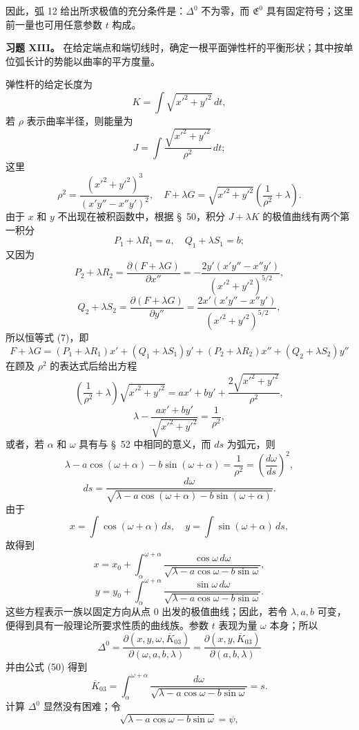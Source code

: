 \documentclass[11pt,a4paper,leqno]{article}
\begin{document}
因此，弧 12 给出所求极值的充分条件是：$\Delta^0$ 不为零，而 $\mathfrak{E}^0$ 具有固定符号；这里前一量也可用任意参数 $t$ 构成。

\noindent\textbf{习题 XIII。} 在给定端点和端切线时，确定一根平面弹性杆的平衡形状；其中按单位弧长计的势能以曲率的平方度量。

弹性杆的给定长度为
\[
K=\int\sqrt{x'^2+y'^2}\,dt,
\]
若 $\rho$ 表示曲率半径，则能量为
\[
J=\int\frac{\sqrt{x'^2+y'^2}}{\rho^2}\,dt;
\]
这里
\[
\rho^2=\frac{(x'^2+y'^2)^3}{(x'y''-x''y')^2},
\quad
F+\lambda G=\sqrt{x'^2+y'^2}\left(\frac1{\rho^2}+\lambda\right).
\]
由于 $x$ 和 $y$ 不出现在被积函数中，根据 \S~50，积分 $J+\lambda K$ 的极值曲线有两个第一积分
\[
P_1+\lambda R_1=a,\quad Q_1+\lambda S_1=b;
\]
又因为
\[
P_2+\lambda R_2
=\frac{\partial(F+\lambda G)}{\partial x''}
=-\frac{2y'(x'y''-x''y')}{(x'^2+y'^2)^{5/2}},
\]
\[
Q_2+\lambda S_2
=\frac{\partial(F+\lambda G)}{\partial y''}
=\frac{2x'(x'y''-x''y')}{(x'^2+y'^2)^{5/2}},
\]
所以恒等式 (7)，即
\[
F+\lambda G=(P_1+\lambda R_1)x'+(Q_1+\lambda S_1)y'
+(P_2+\lambda R_2)x''+(Q_2+\lambda S_2)y''
\]
在顾及 $\rho^2$ 的表达式后给出方程
\[
\left(\frac1{\rho^2}+\lambda\right)\sqrt{x'^2+y'^2}
=ax'+by'+\frac{2\sqrt{x'^2+y'^2}}{\rho^2},
\]
\[
\lambda-\frac{ax'+by'}{\sqrt{x'^2+y'^2}}=\frac1{\rho^2},
\]
或者，若 $\alpha$ 和 $\omega$ 具有与 \S~52 中相同的意义，而 $ds$ 为弧元，则
\begin{equation}\tag{49}
\lambda-a\cos(\omega+\alpha)-b\sin(\omega+\alpha)
=\frac1{\rho^2}=\left(\frac{d\omega}{ds}\right)^2,
\end{equation}
\begin{equation}\tag{50}
ds=\frac{d\omega}{\sqrt{\lambda-a\cos(\omega+\alpha)-b\sin(\omega+\alpha)}}.
\end{equation}
由于
\[
x=\int\cos(\omega+\alpha)\,ds,\quad
y=\int\sin(\omega+\alpha)\,ds,
\]
故得到
\[
x=x_0+\int_\alpha^{\omega+\alpha}
\frac{\cos\omega\,d\omega}{\sqrt{\lambda-a\cos\omega-b\sin\omega}},
\]
\[
y=y_0+\int_\alpha^{\omega+\alpha}
\frac{\sin\omega\,d\omega}{\sqrt{\lambda-a\cos\omega-b\sin\omega}}.
\]
这些方程表示一族以固定方向从点 0 出发的极值曲线；因此，若令 $\lambda,a,b$ 可变，便得到具有一般理论所要求性质的曲线族。参数 $t$ 表现为量 $\omega$ 本身；所以
\[
\Delta^0=
\frac{\partial(x,y,\omega,\overline{K}_{03})}{\partial(\omega,a,b,\lambda)}
=
\frac{\partial(x,y,\overline{K}_{03})}{\partial(a,b,\lambda)}
\]
并由公式 (50) 得到
\[
\overline{K}_{03}=
\int_\alpha^{\omega+\alpha}\frac{d\omega}{\sqrt{\lambda-a\cos\omega-b\sin\omega}}=s.
\]
计算 $\Delta^0$ 显然没有困难；令
\[
\sqrt{\lambda-a\cos\omega-b\sin\omega}=\psi,
\]
\end{document}
